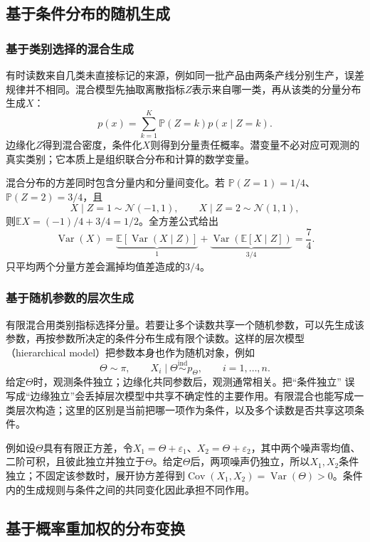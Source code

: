 \subsection{基于条件分布的随机生成}
\label{sec:rv-random-generation}
\subsubsection{基于类别选择的混合生成}
有时读数来自几类未直接标记的来源，例如同一批产品由两条产线分别生产，误差规律并不相同。混合模型先抽取离散指标\(Z\)表示来自哪一类，再从该类的分量分布生成\(X\)：
\[ p(x)=\sum_{k=1}^{K}\mathbb{P}(Z=k)p(x\mid Z=k). \]
边缘化\(Z\)得到混合密度，条件化\(X\)则得到分量责任概率。潜变量不必对应可观测的真实类别；它本质上是组织联合分布和计算的数学变量。

混合分布的方差同时包含分量内和分量间变化。若
\(\mathbb{P}(Z=1)=1/4\)、\(\mathbb{P}(Z=2)=3/4\)，且
\[
  X\mid Z=1\sim\mathcal{N}(-1,1),\qquad
  X\mid Z=2\sim\mathcal{N}(1,1),
\]
则\(\mathbb{E}X=(-1)/4+3/4=1/2\)。全方差公式给出
\[
  \operatorname{Var}(X)
  =\underbrace{\mathbb{E}[\operatorname{Var}(X\mid Z)]}_{1}
   +\underbrace{\operatorname{Var}(\mathbb{E}[X\mid Z])}_{3/4}
  =\frac74.
\]
只平均两个分量方差会漏掉均值差造成的\(3/4\)。

\subsubsection{基于随机参数的层次生成}
有限混合用类别指标选择分量。若要让多个读数共享一个随机参数，可以先生成该参数，再按参数所决定的条件分布生成有限个读数。这样的层次模型（hierarchical model）把参数本身也作为随机对象，例如
\[ \Theta\sim\pi,\qquad
  X_i\mid\Theta\mathrel{\overset{\mathrm{ind}}{\sim}}p_\Theta,\qquad i=1,\ldots,n. \]
给定\(\Theta\)时，观测条件独立；边缘化共同参数后，观测通常相关。把“条件独立”
误写成“边缘独立”会丢掉层次模型中共享不确定性的主要作用。有限混合也能写成一类层次构造；这里的区别是当前把哪一项作为条件，以及多个读数是否共享这项条件。

例如设\(\Theta\)具有有限正方差，令\(X_1=\Theta+\varepsilon_1\)、\(X_2=\Theta+\varepsilon_2\)，其中两个噪声零均值、二阶可积，且彼此独立并独立于\(\Theta\)。给定\(\Theta\)后，两项噪声仍独立，所以\(X_1,X_2\)条件独立；不固定该参数时，展开协方差得到\(\operatorname{Cov}(X_1,X_2)=\operatorname{Var}(\Theta)>0\)。条件内的生成规则与条件之间的共同变化因此承担不同作用。

\subsection{基于概率重加权的分布变换}

